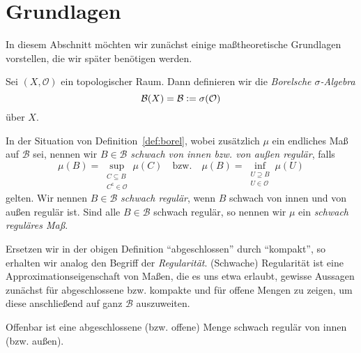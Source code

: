 \documentclass[../main/main.tex]{subfiles}
\begin{document}
	
	\section{Grundlagen}
	\label{Grundlagen}
	
	In diesem Abschnitt möchten wir zunächst einige maßtheoretische Grundlagen vorstellen, 
	die wir später benötigen werden.
	
	\begin{Definition}
		\label{def:borel}
		Sei $(X, \mathcal{O})$ ein topologischer Raum. Dann definieren wir die \emph{Borelsche 
			$\sigma$-Algebra}
		$$\mathcal{B}(X) = \mathcal{B} \vcentcolon = \sigma(\mathcal{O})$$
		über $X$.
	\end{Definition}
	

	\begin{Definition}
		\label{def:regularity}
		In der Situation von Definition~\ref{def:borel}, wobei zusätzlich $\mu$ ein 
		endliches Maß auf $\mathcal{B}$ sei, nennen wir $B \in \mathcal{B}$ \emph{schwach von 
		innen bzw. von außen regulär}, falls
		$$\mu(B) = \sup_{\substack{C \subseteq B \\ C^\mathsf{c} \in \mathcal{O}}} \mu(C) 
		\quad \text{bzw.} \quad \mu(B) = \inf_{\substack{U \supseteq B \\ U \in \mathcal{O}}} 
		\mu(U)$$
		gelten. Wir nennen $B \in \mathcal{B}$ \emph{schwach regulär}, wenn $B$ schwach von innen und 
		von außen regulär ist. Sind alle $B \in \mathcal{B}$ schwach regulär, 
		so nennen wir $\mu$ ein \emph{schwach reguläres Maß}.
	\end{Definition}

	\begin{Bemerkung}
		Ersetzen wir in der obigen Definition \enquote{abgeschlossen} durch \enquote{kompakt}, 
		so erhalten wir analog den Begriff der \emph{Regularität}. (Schwache) Regularität ist eine 
		Approximationseigenschaft von Maßen, die es uns etwa erlaubt, gewisse Aussagen 
		zunächst für abgeschlossene bzw. kompakte und für offene Mengen zu zeigen, um diese 
		anschließend auf ganz $\mathcal{B}$ auszuweiten.
	\end{Bemerkung}

	Offenbar ist eine abgeschlossene (bzw. offene) Menge schwach regulär von innen (bzw. außen).
\end{document}

